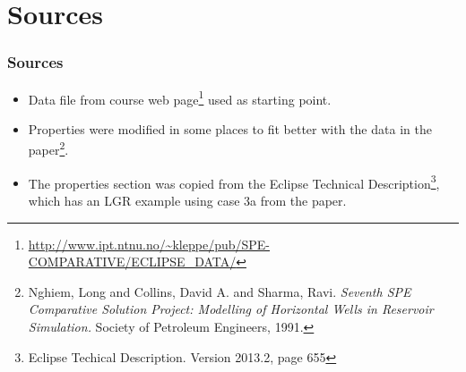 \section{Sources}

\begin{frame}
    \frametitle{Sources}
    \begin{itemize}
        \item Data file from course web page\footnote{\url{http://www.ipt.ntnu.no/~kleppe/pub/SPE-COMPARATIVE/ECLIPSE_DATA/}} used as starting point.
        \pause
        \item Properties were modified in some places to fit better with the data in the paper\footnote{Nghiem, Long and Collins, David A. and Sharma, Ravi. \emph{Seventh SPE Comparative Solution Project: Modelling of Horizontal Wells in Reservoir Simulation.} Society of Petroleum Engineers, 1991.}.
        \pause
        \item The properties section was copied from the Eclipse Technical Description\footnote{Eclipse Techical Description. Version 2013.2, page 655}, which has an LGR example using case 3a from the paper.
    \end{itemize}
\end{frame}
